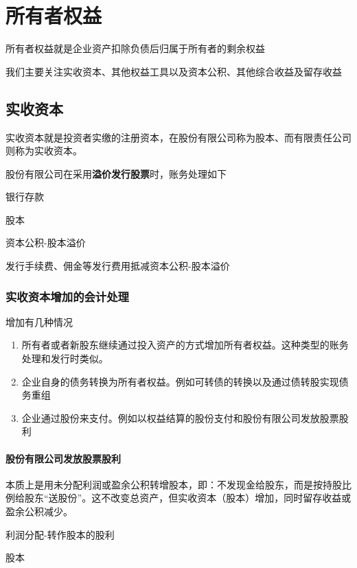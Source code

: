 \documentclass[UTF8,12pt]{ctexart}
\newenvironment{Dr}{%
	\begin{list}{}%
		{
			\setlength{\leftmargin}{2em}
			\setlength{\labelwidth}{2em}
			\setlength{\labelsep}{0pt}
			\setlength{\itemindent}{0pt}
			\setlength{\listparindent}{0pt}
			\setlength{\parsep}{0pt}
			\setlength{\topsep}{0pt}
		}
		\item[\textbf{借：}]
	}{%
	\end{list}
}
\newenvironment{Cr}{%
	\begin{list}{}%
		{
			\setlength{\leftmargin}{2em}
			\setlength{\labelwidth}{2em}
			\setlength{\labelsep}{0pt}
			\setlength{\itemindent}{0pt}
			\setlength{\listparindent}{0pt}
			\setlength{\parsep}{0pt}
			\setlength{\topsep}{0pt}
		}
		\item[\textbf{贷：}]
	}{%
	\end{list}
}
\numberwithin{equation}{section} %
\numberwithin{figure}{section}
\numberwithin{table}{section}
\begin{document}
	
	\newpage
	\section{所有者权益}
	所有者权益就是企业资产扣除负债后归属于所有者的剩余权益
	
	我们主要关注实收资本、其他权益工具以及资本公积、其他综合收益及留存收益
	
	\subsection{实收资本}
	实收资本就是投资者实缴的注册资本，在股份有限公司称为股本、而有限责任公司则称为实收资本。
	
	股份有限公司在采用\textbf{溢价发行股票}时，账务处理如下
	
	\begin{Dr}
		银行存款
	\end{Dr}
	\begin{Cr}
		股本
		
		资本公积-股本溢价
	\end{Cr}
	发行手续费、佣金等发行费用抵减资本公积-股本溢价
	
	\subsubsection{实收资本增加的会计处理}
	
	增加有几种情况
	\begin{enumerate}
		\item 所有者或者新股东继续通过投入资产的方式增加所有者权益。这种类型的账务处理和发行时类似。
		
		\item 企业自身的债务转换为所有者权益。例如可转债的转换以及通过债转股实现债务重组
		
		\item 企业通过股份来支付。例如以权益结算的股份支付和股份有限公司发放股票股利
	\end{enumerate}

	\paragraph{股份有限公司发放股票股利}
	本质上是用未分配利润或盈余公积转增股本，即：不发现金给股东，而是按持股比例给股东“送股份”。这不改变总资产，但实收资本（股本）增加，同时留存收益或盈余公积减少。
	
	\begin{Dr}
		利润分配-转作股本的股利
	\end{Dr}
	\begin{Cr}
		股本
	\end{Cr}
	
\end{document}
